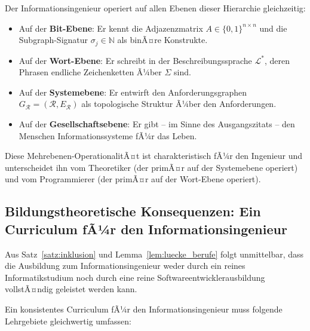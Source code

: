 ﻿\documentclass[a4paper,12pt]{article}
\theoremstyle{definition}
\begin{document}
Der Informationsingenieur operiert auf allen Ebenen dieser Hierarchie gleichzeitig:

\begin{itemize}
  \item Auf der \textbf{Bit-Ebene}: Er kennt die Adjazenzmatrix $A \in \{0,1\}^{n \times n}$
        und die Subgraph-Signatur $\sigma_j \in \mathbb{N}$ als binÃ¤re Konstrukte.
  \item Auf der \textbf{Wort-Ebene}: Er schreibt in der Beschreibungssprache $\mathcal{L}^*$,
        deren Phrasen endliche Zeichenketten Ã¼ber $\Sigma$ sind.
  \item Auf der \textbf{Systemebene}: Er entwirft den Anforderungsgraphen
        $G_\mathcal{R} = (\mathcal{R}, E_\mathcal{R})$ als topologische Struktur
        Ã¼ber den Anforderungen.
  \item Auf der \textbf{Gesellschaftsebene}: Er gibt -- im Sinne des Ausgangszitats --
        den Menschen Informationssysteme fÃ¼r das Leben.
\end{itemize}

Diese Mehrebenen-OperationalitÃ¤t ist charakteristisch fÃ¼r den Ingenieur und unterscheidet
ihn vom Theoretiker (der primÃ¤r auf der Systemebene operiert) und vom Programmierer
(der primÃ¤r auf der Wort-Ebene operiert).

\subsection{Bildungstheoretische Konsequenzen: Ein Curriculum fÃ¼r den Informationsingenieur}

Aus Satz~\ref{satz:inklusion} und Lemma~\ref{lem:luecke_berufe} folgt unmittelbar, dass
die Ausbildung zum Informationsingenieur weder durch ein reines Informatikstudium noch
durch eine reine Softwareentwicklerausbildung vollstÃ¤ndig geleistet werden kann.

Ein konsistentes Curriculum fÃ¼r den Informationsingenieur muss folgende Lehrgebiete
gleichwertig umfassen:
\end{document}
